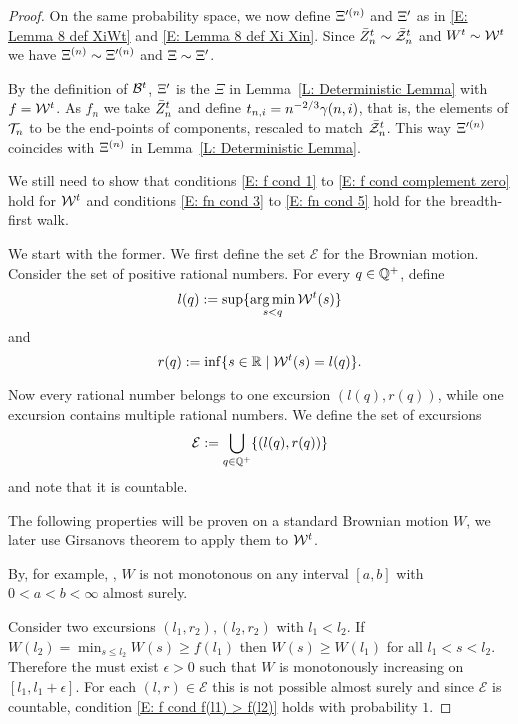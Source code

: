 \begin{proof}
	On the same probability space, we now define $\Xi^{\prime (n)}$ and $\Xi^{\prime}$ as in \eqref{E: Lemma 8 def XiWt} and \eqref{E: Lemma 8 def Xi Xin}.
	Since $\bar{Z}^t_n \sim \bar{\mathcal{Z}}^t_n$ and $W^t \sim \mathcal{W}^t$ we have $\Xi^{(n)} \sim \Xi^{\prime (n)}$ and $\Xi \sim \Xi^{\prime}$.
	
	By the definition of $\mathcal{B}^t$, 
	$\Xi^{\prime}$ is the $\Xi$ in Lemma~\ref{L: Deterministic Lemma} with $f = \mathcal{W}^t$.
	As $f_n$ we take $\bar{Z}^t_n$ and define $t_{n, i} = n^{-2 / 3} \gamma(n,i)$, that is, 
	the elements of $\mathcal{T}_n$ to be the end-points of components,
	rescaled to match $\bar{\mathcal{Z}}^t_n$.
	This way $\Xi^{\prime (n)}$ coincides with $\Xi^{(n)}$ in Lemma~\ref{L: Deterministic Lemma}.
	
	We still need to show that conditions \eqref{E: f cond 1} to \eqref{E: f cond complement zero} hold for $\mathcal{W}^t$
	and conditions \eqref{E: fn cond 3} to \eqref{E: fn cond 5} hold for the breadth-first walk.
	
	We start with the former. 
	We first define the set $\mathcal{E}$ for the Brownian motion.
	Consider the set of positive rational numbers.
	For every $q \in \mathbb{Q}^+$, 
	define 
	\begin{equation}
		l(q) := \sup\{ \operatorname*{arg\,min}_{s < q} \mathcal{W}^t(s) \}
	\end{equation}
	and
	\begin{equation}
		r(q) := \inf\{ {s \in \mathbb{R} \; | \; \mathcal{W}^t(s) = l(q)} \}.
	\end{equation}
	
	Now every rational number belongs to one excursion $(l(q), r(q))$,
	while one excursion contains multiple rational numbers.
	We define the set of excursions
	\begin{equation}
	\mathcal{E} := \bigcup_{q \in \mathbb{Q}^+} \{ (l(q), r(q)) \}
	\end{equation}
	and note that it is countable.
	
	The following properties will be proven on a standard Brownian motion $W$,
	we later use Girsanovs theorem to apply them to $\mathcal{W}^t$.
	
	By, for example, \cite[Theorem 1.22]{Morters.2010},
	$W$ is not monotonous on any interval $[a,b]$ with $0 < a < b < \infty$ almost surely.
	
	Consider two excursions $(l_1, r_2), (l_2, r_2)$ with $l_1 < l_2$.
	If $W(l_2) = \min_{s \leq l_2} W(s) \geq f(l_1)$ then $W(s) \geq W(l_1)$ for all $l_1 < s < l_2$.
	Therefore the must exist $\epsilon>0$ such that $W$ is monotonously increasing on $[l_1, l_1 + \epsilon]$.
	For each $(l,r) \in \mathcal{E}$ this is not possible almost surely
	and since $\mathcal{E}$ is countable,
	condition \eqref{E: f cond f(l1) > f(l2)} holds with probability $1$.
	

\end{proof}
